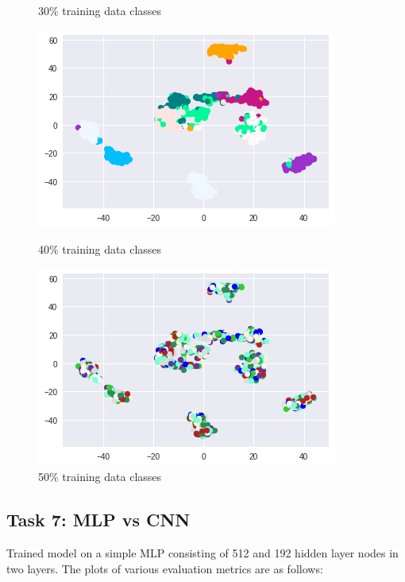 \documentclass{article}
\begin{document}
\begin{figure}[!htb]
	\caption{30\% training data classes}\label{fig:part_1_task_5_class_30}
	\endminipage\hfill
	\includegraphics[width=\linewidth]{../output_plots/FMNIST/clustering/class-distribution-40.png}
	\caption{40\% training data classes}\label{fig:part_1_task_5_class_40}
	\endminipage
	\includegraphics[width=\linewidth]{../output_plots/FMNIST/clustering/class-distribution-50.png}
	\caption{50\% training data classes}\label{fig:part_1_task_5_class_50}
	\endminipage
\end{figure}

\pagebreak
\subsection{Task 7: MLP vs CNN}
Trained model on a simple MLP consisting of 512 and 192 hidden layer nodes in two layers. The plots of various evaluation metrics are as follows:
\end{document}
